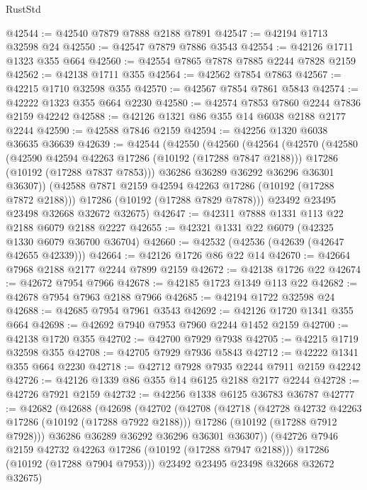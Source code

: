 \begin{lexlean}{RustStd}
\begin{coremodule}
@42544 := @42540 @7879 @7888 @2188 @7891
@42547 := @42194 @1713 @32598 @24
@42550 := @42547 @7879 @7886 @3543
@42554 := @42126 @1711 @1323 @355 @664
@42560 := @42554 @7865 @7878 @7885 @2244 @7828 @2159
@42562 := @42138 @1711 @355
@42564 := @42562 @7854 @7863
@42567 := @42215 @1710 @32598 @355
@42570 := @42567 @7854 @7861 @5843
@42574 := @42222 @1323 @355 @664 @2230
@42580 := @42574 @7853 @7860 @2244 @7836 @2159 @42242
@42588 := @42126 @1321 @86 @355 @14 @6038 @2188 @2177 @2244
@42590 := @42588 @7846 @2159
@42594 := @42256 @1320 @6038 @36635 @36639
@42639 := @42544
    (@42550
      (@42560
        (@42564
          (@42570
            (@42580
              (@42590 @42594 @42263 @17286 (@10192 (@17288 @7847 @2188)))
              @17286
              (@10192 (@17288 @7837 @7853)))
            @36286
            @36289
            @36292
            @36296
            @36301
            @36307))
        (@42588 @7871 @2159 @42594 @42263 @17286 (@10192 (@17288 @7872 @2188)))
        @17286
        (@10192 (@17288 @7829 @7878)))
      @23492
      @23495
      @23498
      @32668
      @32672
      @32675)
@42647 := @42311 @7888 @1331 @113 @22 @2188 @6079 @2188 @2227
@42655 := @42321 @1331 @22 @6079 (@42325 @1330 @6079 @36700 @36704)
@42660 := @42532 (@42536 (@42639 (@42647 @42655 @42339)))
@42664 := @42126 @1726 @86 @22 @14
@42670 := @42664 @7968 @2188 @2177 @2244 @7899 @2159
@42672 := @42138 @1726 @22
@42674 := @42672 @7954 @7966
@42678 := @42185 @1723 @1349 @113 @22
@42682 := @42678 @7954 @7963 @2188 @7966
@42685 := @42194 @1722 @32598 @24
@42688 := @42685 @7954 @7961 @3543
@42692 := @42126 @1720 @1341 @355 @664
@42698 := @42692 @7940 @7953 @7960 @2244 @1452 @2159
@42700 := @42138 @1720 @355
@42702 := @42700 @7929 @7938
@42705 := @42215 @1719 @32598 @355
@42708 := @42705 @7929 @7936 @5843
@42712 := @42222 @1341 @355 @664 @2230
@42718 := @42712 @7928 @7935 @2244 @7911 @2159 @42242
@42726 := @42126 @1339 @86 @355 @14 @6125 @2188 @2177 @2244
@42728 := @42726 @7921 @2159
@42732 := @42256 @1338 @6125 @36783 @36787
@42777 := @42682
    (@42688
      (@42698
        (@42702
          (@42708
            (@42718
              (@42728 @42732 @42263 @17286 (@10192 (@17288 @7922 @2188)))
              @17286
              (@10192 (@17288 @7912 @7928)))
            @36286
            @36289
            @36292
            @36296
            @36301
            @36307))
        (@42726 @7946 @2159 @42732 @42263 @17286 (@10192 (@17288 @7947 @2188)))
        @17286
        (@10192 (@17288 @7904 @7953)))
      @23492
      @23495
      @23498
      @32668
      @32672
      @32675)

\end{coremodule}
\end{lexlean}
